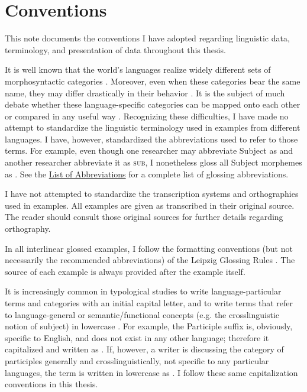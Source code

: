 \section*{Conventions}
\label{sec:conventions}

This note documents the conventions I have adopted regarding linguistic data, terminology, and presentation of data throughout this thesis.


It is well known that the world's languages realize widely different sets of morphosyntactic categories \parencites[58]{Whaley1997}{Haspelmath2007}. Moreover, even when these categories bear the same name, they may differ drastically in their behavior \parencite[9]{Dixon2010}. It is the subject of much debate whether these language-specific categories can be mapped onto each other or compared in any useful way \parencites{Croft1995}[10--15]{Song2001}[13--19]{Croft2003}{Haspelmath2010a}{Haspelmath2010b}{Newmeyer2010}{Stassen2011}[308--310]{Hieber2013}{Croft2014}{Plank2016}[44--58]{Song2018}. Recognizing these difficulties, I have made no attempt to standardize the linguistic terminology used in examples from different languages. I have, however, standardized the abbreviations used to refer to those terms. For example, even though one researcher may abbreviate Subject as  and another researcher abbreviate it as \textsc{sub}, I nonetheless gloss all Subject morphemes as . See the \hyperref[ch:abbreviations]{List of Abbreviations} for a complete list of glossing abbreviations.

I have not attempted to standardize the transcription systems and orthographies used in examples. All examples are given as transcribed in their original source. The reader should consult those original sources for further details regarding orthography.

In all interlinear glossed examples, I follow the formatting conventions (but not necessarily the recommended abbreviations) of the Leipzig Glossing Rules \parencite{BickelComrieHaspelmath2015}. The source of each example is always provided after the example itself.


It is increasingly common in typological studies to write language-particular terms and categories with an initial capital letter, and to write terms that refer to language-general or semantic/functional concepts (e.g. the crosslinguistic notion of subject) in lowercase \parencites[10]{Comrie1976}[47 (fn. 3), 141]{Bybee1985}[66]{Croft2000}[674]{Haspelmath2010a}[535]{Croft2014}. For example, the  Participle suffix  is, obviously, specific to English, and does not exist in any other language; therefore it capitalized and written as . If, however, a writer is discussing the category of participles generally and crosslinguistically, not specific to any particular languages, the term is written in lowercase as . I follow these same capitalization conventions in this thesis.


